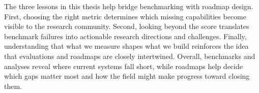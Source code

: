 The three lessons in this thesis help bridge benchmarking with roadmap design. 
First, choosing the right metric determines which missing capabilities become visible to the research community.
Second, looking beyond the score translates benchmark failures into actionable research directions and 
challenges.
Finally, understanding that what we measure shapes what we build reinforces the idea that evaluations and 
roadmaps are closely intertwined. 
Overall, benchmarks and analyses reveal where current systems fall short, while roadmaps 
help decide which gaps matter most and how the field might make progress toward closing them.
